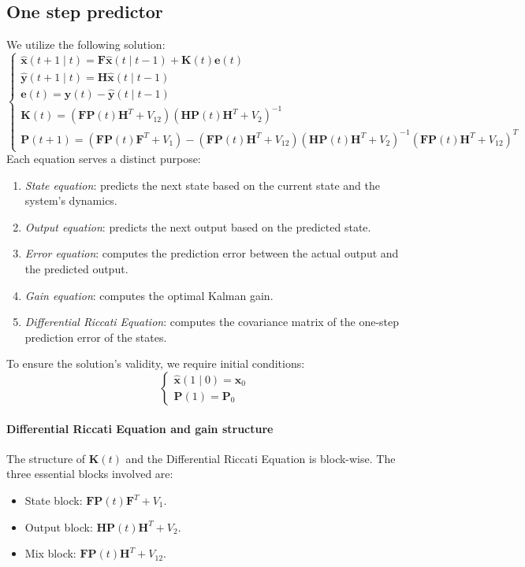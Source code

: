 \subsection{One step predictor}
We utilize the following solution:
\[\begin{cases}
    \hat{\mathbf{x}}(t+1\mid t)=\mathbf{F}\hat{\mathbf{x}}(t\mid t-1)+\mathbf{K}(t)\mathbf{e}(t) \\ 
    \hat{\mathbf{y}}(t+1\mid t)=\mathbf{H}\hat{\mathbf{x}}(t\mid t-1) \\
    \mathbf{e}(t)=\mathbf{y}(t)-\hat{\mathbf{y}}(t\mid t-1) \\
    \mathbf{K}(t)=\left(\mathbf{FP}(t)\mathbf{H}^T+V_{12}\right)\left(\mathbf{HP}(t)\mathbf{H}^T+V_2\right)^{-1} \\
    \mathbf{P}(t+1)=\left(\mathbf{FP}(t)\mathbf{F}^T+V_1\right)-\left(\mathbf{FP}(t)\mathbf{H}^T+V_{12}\right)\left(\mathbf{HP}(t)\mathbf{H}^T+V_{2}\right)^{-1}\left(\mathbf{FP}(t)\mathbf{H}^T+V_{12}\right)^T
\end{cases}\]
Each equation serves a distinct purpose:
\begin{enumerate}
    \item \textit{State equation}: predicts the next state based on the current state and the system's dynamics.
    \item \textit{Output equation}: predicts the next output based on the predicted state.
    \item \textit{Error equation}: computes the prediction error between the actual output and the predicted output.
    \item \textit{Gain equation}: computes the optimal Kalman gain.
    \item \textit{Differential Riccati Equation}: computes the covariance matrix of the one-step prediction error of the states.
\end{enumerate}
To ensure the solution's validity, we require initial conditions:
\[\begin{cases}
    \hat{\mathbf{x}}(1\mid 0)=\mathbf{x}_0 \\
    \mathbf{P}(1)=\mathbf{P}_0
\end{cases}\]

\paragraph*{Differential Riccati Equation and gain structure}
The structure of $\mathbf{K}(t)$ and the Differential Riccati Equation  is block-wise. 
The three essential blocks involved are:
\begin{itemize}
    \item State block: $\mathbf{FP}(t)\mathbf{F}^T+V_1$.
    \item Output block: $\mathbf{HP}(t)\mathbf{H}^T+V_{2}$.
    \item Mix block: $\mathbf{FP}(t)\mathbf{H}^T+V_{12}$.
\end{itemize}

